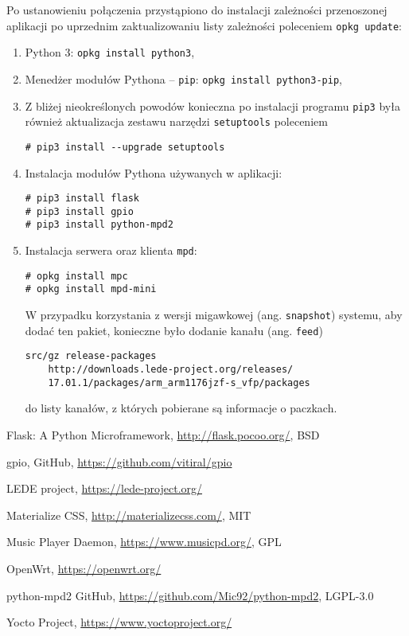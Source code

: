 \documentclass[10pt,a4paper]{article}
\begin{document}
Po ustanowieniu połączenia przystąpiono do instalacji zależności przenoszonej aplikacji po
uprzednim zaktualizowaniu listy zależności poleceniem \texttt{opkg update}:

\begin{enumerate}
	\item Python 3: \texttt{opkg install python3},
	\item Menedżer modułów Pythona -- \texttt{pip}: \texttt{opkg install python3-pip},
	\item Z bliżej nieokreślonych powodów konieczna po instalacji programu \texttt{pip3}
		była również aktualizacja zestawu narzędzi \texttt{setuptools} poleceniem
\begin{lstlisting}
# pip3 install --upgrade setuptools
\end{lstlisting}
	\item Instalacja modułów Pythona używanych w aplikacji:
\begin{lstlisting}
# pip3 install flask
# pip3 install gpio
# pip3 install python-mpd2
\end{lstlisting}
	\item Instalacja serwera oraz klienta \texttt{mpd}:
\begin{lstlisting}
# opkg install mpc
# opkg install mpd-mini
\end{lstlisting}
		W przypadku korzystania z wersji migawkowej (ang. \texttt{snapshot}) systemu, aby
		dodać ten pakiet, konieczne było dodanie kanału (ang. \texttt{feed})
\begin{lstlisting}
src/gz release-packages 
	http://downloads.lede-project.org/releases/
	17.01.1/packages/arm_arm1176jzf-s_vfp/packages
\end{lstlisting}
		do listy kanałów, z których pobierane są informacje o paczkach.
\end{enumerate}


\begin{thebibliography}{9}

		Flask: A Python Microframework,
		\url{http://flask.pocoo.org/},
		BSD

		gpio,
		GitHub,
		\url{https://github.com/vitiral/gpio}

		LEDE project,
		\url{https://lede-project.org/}

		Materialize CSS,
		\url{http://materializecss.com/},
		MIT

		Music Player Daemon,
		\url{https://www.musicpd.org/},
		GPL

		OpenWrt,
		\url{https://openwrt.org/}
	
		python-mpd2
		GitHub,
		\url{https://github.com/Mic92/python-mpd2},
		LGPL-3.0

		Yocto Project,
		\url{https://www.yoctoproject.org/}

\end{thebibliography}
\end{document}
